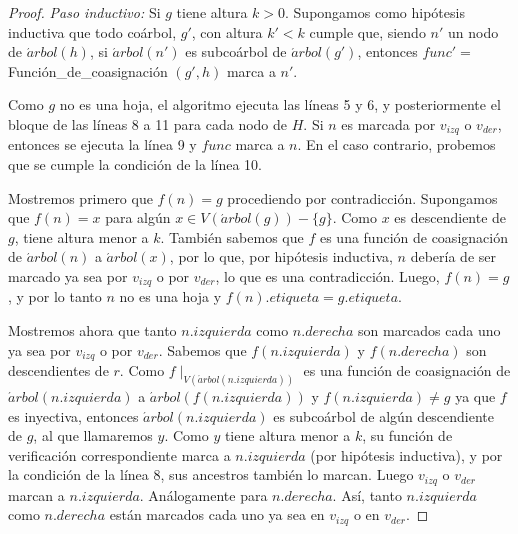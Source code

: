 \begin{proof}
    \emph{Paso inductivo:} Si $g$ tiene altura $k > 0$. Supongamos como
    hip\'otesis inductiva que todo coárbol, $g'$, con altura $k' < k$ cumple
    que, siendo $n'$ un nodo de $\acute{a}rbol(h)$, si $\acute{a}rbol(n')$ es
    subcoárbol de $\acute{a}rbol(g')$, entonces $func' =
    $Función\_de\_coasignación $(g',h)$ marca a $n'$.

    Como $g$ no es una hoja, el algoritmo ejecuta las líneas 5 y 6, y
    posteriormente el bloque de las líneas 8 a 11 para cada nodo de $H$. Si
    $n$ es marcada por $v_{izq}$ o $v_{der}$, entonces se ejecuta la línea 9 y
    $func$ marca a $n$. En el caso contrario, probemos que se cumple la
    condición de la línea 10.

    Mostremos primero que $f(n) = g$ procediendo por contradicción.
    Supongamos que $f(n) = x$ para algún $x \in V(\acute{a}rbol(g))-\{g\}$.
    Como $x$ es descendiente de $g$, tiene altura menor a $k$. También
    sabemos que $f$ es una función de coasignación de $\acute{a}rbol(n)$ a
    $\acute{a}rbol(x)$, por lo que, por hip\'otesis inductiva, $n$ debería de
    ser marcado ya sea por $v_{izq}$ o por $v_{der}$, lo que es una
    contradicción. Luego, $f(n) = g$, y por lo tanto $n$ no es una hoja y
    $f(n).etiqueta = g.etiqueta$.

    Mostremos ahora que tanto $n.izquierda$ como $n.derecha$ son marcados
    cada uno ya sea por $v_{izq}$ o por $v_{der}$.  Sabemos que
    $f(n.izquierda)$ y $f(n.derecha)$ son descendientes de $r$. Como
    $f \mid_{V(\acute{a}rbol(n.izquierda))}$ es una función de coasignación
    de $\acute{a}rbol(n.izquierda)$ a $\acute{a}rbol(f(n.izquierda))$ y
    $f(n.izquierda) \neq g$ ya que $f$ es inyectiva, entonces
    $\acute{a}rbol(n.izquierda)$ es subcoárbol de algún descendiente de $g$,
    al que llamaremos $y$. Como $y$ tiene altura menor a $k$, su función de
    verificación correspondiente marca a $n.izquierda$ (por hip\'otesis
    inductiva), y por la condición de la línea 8, sus ancestros también lo
    marcan. Luego $v_{izq}$ o $v_{der}$ marcan a $n.izquierda$. Análogamente
    para $n.derecha$. Así, tanto $n.izquierda$ como $n.derecha$ están
    marcados cada uno ya sea en $v_{izq}$ o en $v_{der}$.


\end{proof}
